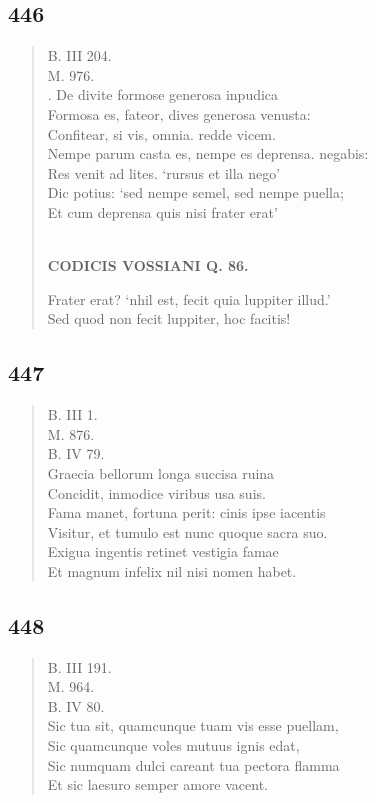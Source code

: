 \documentclass[11pt, a4paper]{report}
\begin{document}
            \subsection*{446}
      \begin{verse}
      B. III 204. \\ M. 976. \\ . De divite formose generosa inpudica \\ Formosa es, fateor, dives generosa venusta: \\ Confitear, si vis, omnia. redde vicem. \\ Nempe parum casta es, nempe es deprensa. negabis: \\ Res venit ad lites. ‘rursus et illa nego’ \\ Dic potius: ‘sed nempe semel, sed nempe puella; \\ Et cum deprensa quis nisi frater erat’ \\ 
        ﻿\pagebreak 
    \begin{center} \textbf{CODICIS VOSSIANI Q. 86.} \end{center} \marginpar{[335]} Frater erat? ‘nhil est, fecit quia luppiter illud.’ \\ Sed quod non fecit luppiter, hoc facitis! \\ 
      \end{verse}
  
            \subsection*{447}
      \begin{verse}
      B. III 1. \\ M. 876. \\ B. IV 79. \\ Graecia bellorum longa succisa ruina \\ Concidit, inmodice viribus usa suis. \\ Fama manet, fortuna perit: cinis ipse iacentis \\ Visitur, et tumulo est nunc quoque sacra suo. \\ Exigua ingentis retinet vestigia famae \\ Et magnum infelix nil nisi nomen habet. \\ 
      \end{verse}
  
            \subsection*{448}
      \begin{verse}
      B. III 191. \\ M. 964. \\ B. IV 80. \\ Sic tua sit, quamcunque tuam vis esse puellam, \\ Sic quamcunque voles mutuus ignis edat, \\ Sic numquam dulci careant tua pectora flamma \\ Et sic laesuro semper amore vacent. \\ 
      \end{verse}
  
\end{document}
